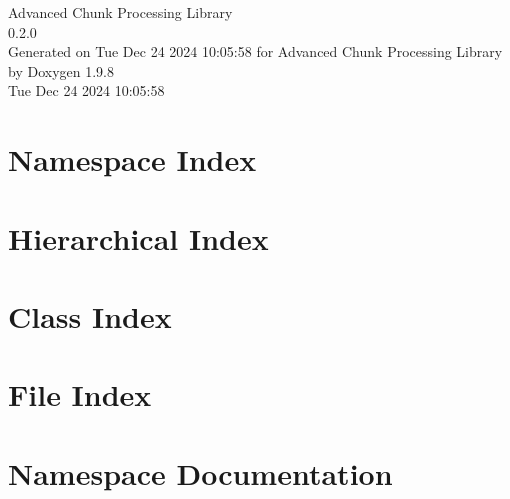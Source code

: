 \documentclass[twoside]{book}
\newcommand{\+}{\discretionary{\mbox{\scriptsize$\hookleftarrow$}}{}{}}
\newcommand{\clearemptydoublepage}{%
    \newpage{\pagestyle{empty}\cleardoublepage}%
  }
\begin{document}
  \raggedbottom
    \hypersetup{pageanchor=false,
                bookmarksnumbered=true,
                pdfencoding=unicode
               }
  \begin{titlepage}
  \vspace*{7cm}
  \begin{center}%
  {\Large Advanced Chunk Processing Library}\\
  [1ex]\large 0.\+2.\+0 \\
  \vspace*{1cm}
  {\large Generated on Tue Dec 24 2024 10\+:05\+:58 for Advanced Chunk Processing Library by Doxygen 1.9.8}\\
    \vspace*{0.5cm}
    {\small Tue Dec 24 2024 10:05:58}
  \end{center}
  \end{titlepage}
  \clearemptydoublepage
  \tableofcontents
  \clearemptydoublepage
  \hypersetup{pageanchor=true}

\chapter{Namespace Index}

\chapter{Hierarchical Index}

\chapter{Class Index}

\chapter{File Index}

\chapter{Namespace Documentation}















\end{document}
